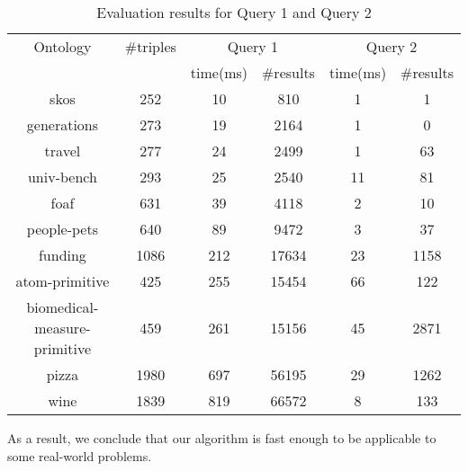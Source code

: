 \begin{table*}
\centering
\caption{Evaluation results for Query 1 and Query 2}
\label{tbl1}

\begin{tabular}{ | c | c | c | c | c | c |}
\hline
Ontology & \#triples & \multicolumn{2}{|c|}{Query 1} & \multicolumn{2}{|c|}{Query 2} \\
\cline{3-6}
& & time(ms) & \#results & time(ms) & \#results \\
\hline 
\hline
skos        & 252 & 10 & 810 & 1 & 1 \\
generations & 273 & 19 & 2164 & 1 & 0 \\
travel      & 277 & 24 & 2499 & 1 & 63 \\
univ-bench  & 293 & 25 & 2540 & 11 & 81 \\
foaf        & 631 & 39 & 4118 & 2 & 10 \\
people-pets & 640 & 89 & 9472 & 3 & 37 \\
funding     & 1086 & 212 & 17634 & 23 & 1158 \\
atom-primitive & 425 & 255 & 15454 & 66 & 122 \\
biomedical-measure-primitive & 459 & 261 & 15156 & 45 & 2871 \\
pizza       & 1980 & 697 & 56195 & 29 & 1262 \\
wine        & 1839 & 819 & 66572 & 8 & 133 \\
\hline
\end{tabular}

\end{table*}

As a result, we conclude that our algorithm is fast enough to be applicable to some real-world problems.

